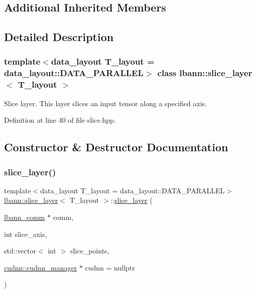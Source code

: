 \subsection*{Additional Inherited Members}


\subsection{Detailed Description}
\subsubsection*{template$<$data\+\_\+layout T\+\_\+layout = data\+\_\+layout\+::\+D\+A\+T\+A\+\_\+\+P\+A\+R\+A\+L\+L\+EL$>$\newline
class lbann\+::slice\+\_\+layer$<$ T\+\_\+layout $>$}

Slice layer. This layer slices an input tensor along a specified axis. 

Definition at line 40 of file slice.\+hpp.



\subsection{Constructor \& Destructor Documentation}
\mbox{\label{classlbann_1_1slice__layer_a248cf99da690964ac0209684f8c13c1d}} 
\subsubsection{\texorpdfstring{slice\+\_\+layer()}{slice\_layer()}\hspace{0.1cm}{\footnotesize\ttfamily [1/2]}}
{\footnotesize\ttfamily template$<$data\+\_\+layout T\+\_\+layout = data\+\_\+layout\+::\+D\+A\+T\+A\+\_\+\+P\+A\+R\+A\+L\+L\+EL$>$ \\
\hyperlink{classlbann_1_1slice__layer}{lbann\+::slice\+\_\+layer}$<$ T\+\_\+layout $>$\+::\hyperlink{classlbann_1_1slice__layer}{slice\+\_\+layer} (\begin{DoxyParamCaption}\item[{\hyperlink{classlbann_1_1lbann__comm}{lbann\+\_\+comm} $\ast$}]{comm,  }\item[{int}]{slice\+\_\+axis,  }\item[{std\+::vector$<$ int $>$}]{slice\+\_\+points,  }\item[{\hyperlink{classlbann_1_1cudnn_1_1cudnn__manager}{cudnn\+::cudnn\+\_\+manager} $\ast$}]{cudnn = {\ttfamily nullptr} }\end{DoxyParamCaption})\hspace{0.3cm}{\ttfamily [inline]}}



